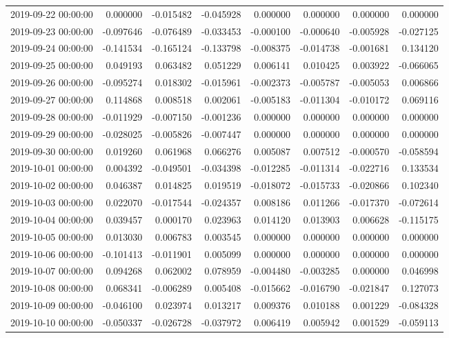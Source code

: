 \begin{tabular}{lrrrrrrr}
2019-09-22 00:00:00 & 0.000000 & -0.015482 & -0.045928 & 0.000000 & 0.000000 & 0.000000 & 0.000000 \\
2019-09-23 00:00:00 & -0.097646 & -0.076489 & -0.033453 & -0.000100 & -0.000640 & -0.005928 & -0.027125 \\
2019-09-24 00:00:00 & -0.141534 & -0.165124 & -0.133798 & -0.008375 & -0.014738 & -0.001681 & 0.134120 \\
2019-09-25 00:00:00 & 0.049193 & 0.063482 & 0.051229 & 0.006141 & 0.010425 & 0.003922 & -0.066065 \\
2019-09-26 00:00:00 & -0.095274 & 0.018302 & -0.015961 & -0.002373 & -0.005787 & -0.005053 & 0.006866 \\
2019-09-27 00:00:00 & 0.114868 & 0.008518 & 0.002061 & -0.005183 & -0.011304 & -0.010172 & 0.069116 \\
2019-09-28 00:00:00 & -0.011929 & -0.007150 & -0.001236 & 0.000000 & 0.000000 & 0.000000 & 0.000000 \\
2019-09-29 00:00:00 & -0.028025 & -0.005826 & -0.007447 & 0.000000 & 0.000000 & 0.000000 & 0.000000 \\
2019-09-30 00:00:00 & 0.019260 & 0.061968 & 0.066276 & 0.005087 & 0.007512 & -0.000570 & -0.058594 \\
2019-10-01 00:00:00 & 0.004392 & -0.049501 & -0.034398 & -0.012285 & -0.011314 & -0.022716 & 0.133534 \\
2019-10-02 00:00:00 & 0.046387 & 0.014825 & 0.019519 & -0.018072 & -0.015733 & -0.020866 & 0.102340 \\
2019-10-03 00:00:00 & 0.022070 & -0.017544 & -0.024357 & 0.008186 & 0.011266 & -0.017370 & -0.072614 \\
2019-10-04 00:00:00 & 0.039457 & 0.000170 & 0.023963 & 0.014120 & 0.013903 & 0.006628 & -0.115175 \\
2019-10-05 00:00:00 & 0.013030 & 0.006783 & 0.003545 & 0.000000 & 0.000000 & 0.000000 & 0.000000 \\
2019-10-06 00:00:00 & -0.101413 & -0.011901 & 0.005099 & 0.000000 & 0.000000 & 0.000000 & 0.000000 \\
2019-10-07 00:00:00 & 0.094268 & 0.062002 & 0.078959 & -0.004480 & -0.003285 & 0.000000 & 0.046998 \\
2019-10-08 00:00:00 & 0.068341 & -0.006289 & 0.005408 & -0.015662 & -0.016790 & -0.021847 & 0.127073 \\
2019-10-09 00:00:00 & -0.046100 & 0.023974 & 0.013217 & 0.009376 & 0.010188 & 0.001229 & -0.084328 \\
2019-10-10 00:00:00 & -0.050337 & -0.026728 & -0.037972 & 0.006419 & 0.005942 & 0.001529 & -0.059113 \\

\end{tabular}
